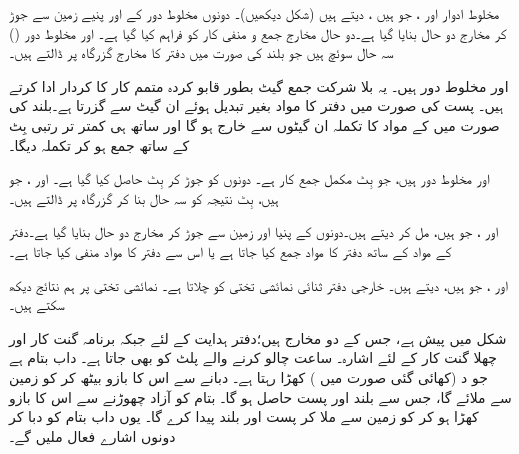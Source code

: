  مخلوط ادوار  اور   ، جو  ہیں  ، دیتے ہیں (شکل  دیکھیں)۔ دونوں مخلوط دور کے  اور  پنیے زمین سے جوڑ کر   مخارج دو حال بنایا گیا ہے۔دو حال مخارج جمع و منفی کار کو فراہم کیا گیا ہے۔  اور  مخلوط دور ()     سہ حال    سوئچ  ہیں جو بلند  کی صورت میں دفتر  کا مخارج   گزرگاہ پر ڈالتے ہیں۔

 اور  مخلوط دور  ہیں۔ یہ بلا شرکت جمع گیٹ بطور قابو  کردہ  متمم کار  کا کردار ادا کرتے ہیں۔ پست  کی صورت میں  دفتر  کا مواد بغیر تبدیل ہوئے ان  گیٹ سے گزرتا ہے۔بلند  کی صورت میں   کے مواد کا  تکملہ   ان گیٹوں سے خارج ہو گا اور ساتھ ہی کمتر تر  رتبی بِٹ کے ساتھ  جمع ہو کر تکملہ  دیگا۔

 اور  مخلوط دور  ہیں، جو  بِٹ  مکمل جمع کار ہے۔ دونوں کو جوڑ کر   بِٹ  حاصل کیا گیا ہے۔  اور ، جو  ہیں،  بِٹ نتیجہ کو سہ حال بنا کر   گزرگاہ پر ڈالتے ہیں۔

 اور ، جو  ہیں، مل کر  دیتے ہیں۔دونوں کے پنیا  اور  زمین سے جوڑ کر مخارج دو حال بنایا گیا ہے۔دفتر   کے مواد کے ساتھ  دفتر  کا مواد جمع کیا جاتا ہے یا اس سے دفتر  کا مواد  منفی کیا جاتا ہے۔

 اور  ، جو  ہیں،  دیتے ہیں۔ خارجی دفتر ثنائی  نمائشی تختی کو  چلاتا ہے۔ نمائشی تختی پر ہم نتائج دیکھ سکتے ہیں۔

شکل  میں  پیش ہے، جس کے دو مخارج ہیں؛دفتر  ہدایت  کے لئے   جبکہ برنامہ گنت کار اور چھلا گنت کار کے لئے  اشارہ۔  ساعت چالو کرنے والے پلٹ  کو بھی جاتا ہے۔  داب بتام ہے جو د (کھائی گئی  صورت میں ) کھڑا رہتا ہے۔ دبانے سے  اس کا بازو   بیٹھ کر      کو زمین سے ملائے  گا، جس سے بلند  اور پست  حاصل ہو گا۔ بتام کو آزاد چھوڑنے سے اس کا بازو کھڑا ہو کر   کو زمین سے ملا کر پست  اور بلند  پیدا کرے گا۔ یوں داب  بتام  کو دبا کر دونوں اشارے فعال  ملیں گے۔

